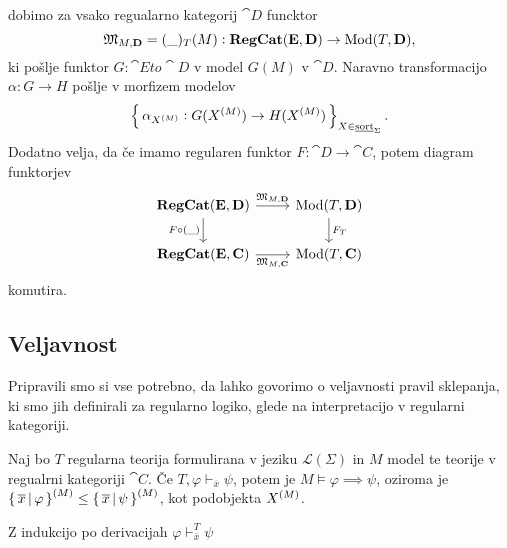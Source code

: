 \documentclass[../kategoricna_logika.tex]{subfiles}
\begin{document}
dobimo za vsako regualarno kategorij $\cat{D}$ funcktor
$$\mathfrak{M}_{M,{\operatorname{\mathbf{D}}}} = (\_)_T(M): {\operatorname{\mathbf{RegCat}}}({\operatorname{\mathbf{E}}}, {\operatorname{\mathbf{D}}}) \to \operatorname{Mod}(T, {\operatorname{\mathbf{D}}}),$$
ki pošlje funktor $G : \cat{E} to \cat{D}$ v model $G(M)$ v $\cat{D}$.
Naravno transformacijo $\alpha : G \to H$ pošlje v morfizem modelov
$$\left\lbrace\,\alpha_{{X}^{(M)}}: G({X}^{(M)}) \to H({X}^{(M)})\,\right\rbrace_{X \in \underline{\mathrm{sort}}_{\Sigma}}.$$
Dodatno velja, da če imamo regularen funktor $F : \cat{D} \to \cat{C}$, potem diagram funktorjev
\begin{equation}
  \begin{tikzcd}
    \cat{RegCat}(\cat{E}, \cat{D}) \ar[d, "F \circ (\_)"'] \ar[r, "\mathfrak{M}_{M,\cat{D}}"] & \Mod(T, \cat{D}) \ar[d, "F_T"] \\
    \cat{RegCat}(\cat{E}, \cat{C}) \ar[r, "\mathfrak{M}_{M,\cat{C}}"'] & \Mod(T, \cat{C})
  \end{tikzcd}
\end{equation}
komutira.
\subsection{Veljavnost}
Pripravili smo si vse potrebno, da lahko govorimo o veljavnosti pravil sklepanja, ki smo jih definirali za regularno logiko,
glede na interpretacijo v regularni kategoriji.
\begin{izrek}[Veljavnost]
  Naj bo $T$ regularna teorija formulirana v jeziku $\mathcal{L}(\Sigma)$ in $M$ model te teorije v regualrni kategoriji $\cat{C}$.
  Če $T, \varphi \vdash_{\overline{x}} \psi$, potem je $M \models \varphi \implies \psi$,
  oziroma je $\left\lbrace\,\overline{x} \,\middle|\, \varphi\,\right\rbrace^{(M)} \leq \left\lbrace\,\overline{x} \,\middle|\, \psi\,\right\rbrace^{(M)}$, kot podobjekta ${X}^{(M)}$.
\end{izrek}
\begin{dokaz}
  Z indukcijo po derivacijah $\varphi \vdash_{\overline{x}}^{T} \psi$
\end{dokaz}
%
\end{document}
